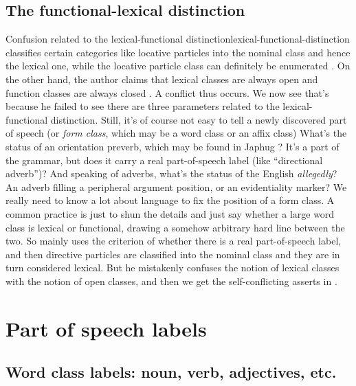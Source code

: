 \documentclass[UTF8, a4paper, oneside, scheme=plain, 12pt]{ctexrep}
\newcommand*{\citesec}[1]{\S~{#1}}
\newcommand*{\term}[1]{\emph{#1}}
\newcommand{\form}[1]{\emph{#1}}
\begin{document}
\subsection{The functional-lexical distinction}

\begin{infobox}{Confusion related to the lexical-functional distinction}{lexical-functional-distinction}
    \citep[\citesec{3.6}]{zhudexigrammar} classifies 
    certain categories like locative particles %
    into the nominal class and hence the lexical one,
    while the locative particle class can definitely be enumerated \citep[\citesec{4.4}]{zhudexigrammar}.
    On the other hand, 
    the author claims that lexical classes are always open 
    and function classes are always closed \citet[\citesec{3.4}]{zhudexigrammar}.
    A conflict thus occurs.
    We now see that's because he failed to see there are three parameters 
    related to the lexical-functional distinction.  
    Still, it's of course not easy to tell a newly discovered part of speech 
    (or \term{form class}, which may be a word class or an affix class)
    What's the status of an orientation preverb, 
    which may be found in Japhug \citep{jacques2021grammar}?
    It's a part of the grammar,
    but does it carry a real part-of-speech label (like ``directional adverb'')?
    And speaking of adverbs, what's the status of the English \form{allegedly}?
    An adverb filling a peripheral argument position,
    or an evidentiality marker?
    We really need to know a lot about language to fix the position of a form class.
    A common practice is just to shun the details and just say 
    whether a large word class is lexical or functional,
    drawing a somehow arbitrary hard line between the two.
    So \citet{zhudexigrammar} mainly uses the criterion of whether there is a real part-of-speech label,
    and then directive particles are classified into the nominal class 
    and they are in turn considered lexical.
    But he mistakenly confuses the notion of lexical classes with the notion of open classes,
    and then we get the self-conflicting asserts in \citet[\citesec{3.4}]{zhudexigrammar}.
\end{infobox}


\section{Part of speech labels}

\subsection{Word class labels: noun, verb, adjectives, etc.}
\end{document}
